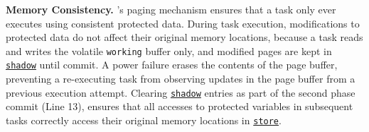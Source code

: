 

\textbf{Memory Consistency.} \sys's paging mechanism ensures that a task only ever executes using consistent
protected data. During task execution, modifications to protected data do not
affect their original memory locations, because a task reads and writes the
volatile \texttt{working} buffer only, and modified pages are kept in
\texttt{\underline{shadow}} until commit. A power failure erases the contents
of the page buffer, preventing a re-executing task from observing updates in
the page buffer from a previous execution attempt. Clearing \texttt{\underline{shadow}}
entries as part of the second phase commit (Line 13), ensures that all accesses to
protected variables in subsequent tasks correctly access their original memory
locations in \texttt{\underline{store}}.
%

%
%
